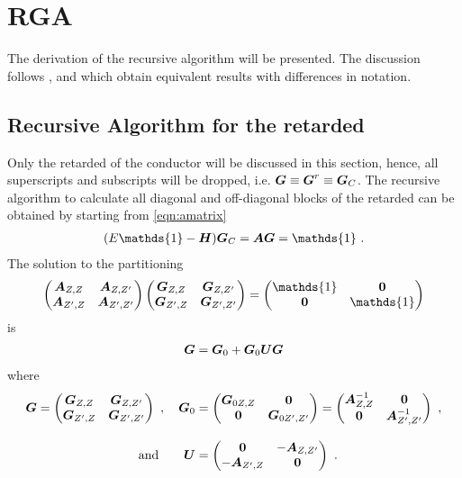\chapter{RGA}
\label{app:RGA}
The derivation of the recursive \gfnc{} algorithm will be presented. The discussion follows \cite{JApplPhys.91.2343}, \cite{JApplPhys.81.7845} and \cite{Wimmer2009Thesis} which obtain equivalent results with differences in notation.
\section{Recursive Algorithm for the retarded \gfnc{}}
Only the retarded \gfnc{} of the conductor will be discussed in this section, hence, all superscripts and subscripts will be dropped, i.e. $\boldsymbol{G} \equiv \boldsymbol{G}^r\equiv \boldsymbol{G}_C$. The recursive algorithm to calculate all diagonal and off-diagonal blocks of the retarded \gfnc{} can be obtained by starting from \cref{eqn:amatrix}
\begin{align}
  (E\mathds{1}-\mat{H})\mat{G}_C = \mat{A}\mat{G}=\mathds{1}\ .
  \label{eqn:amatrixppendix}
\end{align}
The solution to the partitioning
\begin{align}
  \begin{pmatrix} \mat{A}_{Z,Z} & \mat{A}_{Z,Z'}\\
		  \mat{A}_{Z',Z} & \mat{A}_{Z',Z'}
  \end{pmatrix}
  \begin{pmatrix} \mat{G}_{Z,Z} & \mat{G}_{Z,Z'}\\
		  \mat{G}_{Z',Z} & \mat{G}_{Z',Z'}
  \end{pmatrix} = 
  \begin{pmatrix} \mathds{1} & \mat{0}\\
		  \mat{0} & \mathds{1}
  \end{pmatrix}
\end{align}
is
\begin{align}
  \boldsymbol{G}=\boldsymbol{G}_0+\boldsymbol{G}_0\boldsymbol{U}\boldsymbol{G}
  \label{eqn:dysonequationappendix}
\end{align}
where 
\begin{align}
  \boldsymbol{G} = 
  \begin{pmatrix} \boldsymbol{G}_{Z,Z} & \boldsymbol{G}_{Z,Z'}\\
		  \boldsymbol{G}_{Z',Z} & \boldsymbol{G}_{Z',Z'}
  \end{pmatrix}\ ,\quad
  \boldsymbol{G}_0 &= 
  \begin{pmatrix} \boldsymbol{G}_{0 Z,Z} & \boldsymbol{0}\\
		  \boldsymbol{0} & \boldsymbol{G}_{0 Z',Z'}
  \end{pmatrix}=
  \begin{pmatrix} \boldsymbol{A}^{-1}_{Z,Z} & \boldsymbol{0}\\
		  \boldsymbol{0} & \boldsymbol{A}^{-1}_{Z',Z'}
  \end{pmatrix}\ ,\notag\\[3mm] 
  \text{and}\hspace{2em}
  \boldsymbol{U} &= 
  \begin{pmatrix} \boldsymbol{0} & -\boldsymbol{A}_{Z,Z'}\\
		  -\boldsymbol{A}_{Z',Z} & \boldsymbol{0}
  \end{pmatrix}\ .
\end{align}
